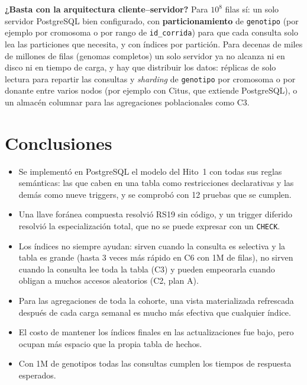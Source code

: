 \textbf{¿Basta con la arquitectura cliente--servidor?} Para $10^8$ filas sí: un solo servidor PostgreSQL bien
configurado, con \textbf{particionamiento} de \texttt{genotipo} (por ejemplo por cromosoma o por rango de
\texttt{id\_\allowbreak{}corrida}) para que cada consulta solo lea las particiones que necesita, y con índices por partición.
Para decenas de miles de millones de filas (genomas completos) un solo servidor ya no alcanza ni en disco ni en
tiempo de carga, y hay que distribuir los datos: réplicas de solo lectura para repartir las consultas y
\textit{sharding} de \texttt{genotipo} por cromosoma o por donante entre varios nodos (por ejemplo con Citus, que
extiende PostgreSQL), o un almacén columnar para las agregaciones poblacionales como C3.

\section{Conclusiones}

\begin{itemize}
  \item Se implementó en PostgreSQL el modelo del Hito~1 con todas sus reglas semánticas: las que caben en una tabla
        como restricciones declarativas y las demás como nueve triggers, y se comprobó con 12 pruebas que se cumplen.
  \item Una llave foránea compuesta resolvió RS19 sin código, y un trigger diferido resolvió la especialización
        total, que no se puede expresar con un \texttt{CHECK}.
  \item Los índices no siempre ayudan: sirven cuando la consulta es selectiva y la tabla es grande (hasta 3 veces
        más rápido en C6 con 1M de filas), no sirven cuando la consulta lee toda la tabla (C3) y pueden empeorarla
        cuando obligan a muchos accesos aleatorios (C2, plan A).
  \item Para las agregaciones de toda la cohorte, una vista materializada refrescada después de cada carga
        semanal es mucho más efectiva que cualquier índice.
  \item El costo de mantener los índices finales en las actualizaciones fue bajo, pero ocupan más espacio que la
        propia tabla de hechos.
  \item Con 1M de genotipos todas las consultas cumplen los tiempos de respuesta esperados.
\end{itemize}

